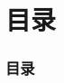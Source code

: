 
\begin{frame}
  \titlepage
\end{frame}

\section*{目录}
\label{sec:toc}
\begin{frame}
  \frametitle{\textbf{目录}}
  \textbf{\tableofcontents}
\end{frame}
